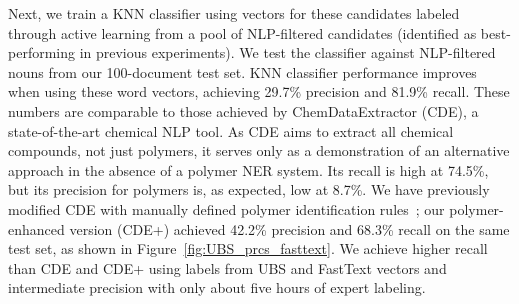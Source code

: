 Next, we train a KNN classifier using vectors for these candidates labeled through active learning from a pool of NLP-filtered candidates (identified as best-performing in previous experiments).
We test the classifier against NLP-filtered nouns from our 100-document test set.
KNN classifier performance improves when using these word vectors, 
achieving 29.7\% precision and 81.9\% recall.
These numbers are comparable to those achieved by ChemDataExtractor (CDE), a state-of-the-art chemical NLP tool.
As CDE aims to extract all
chemical compounds, not just polymers, it serves only as a demonstration of an
alternative approach in the absence of a polymer NER system. %
Its recall is high
at 74.5\%, but its precision for polymers is, as expected, low at 8.7\%. 
We have previously modified CDE with
manually defined polymer identification rules~\cite{tchoua2017towards};
our polymer-enhanced version (CDE+) achieved 42.2\% precision and 68.3\% recall on the same test set,
as shown in Figure~\ref{fig:UBS_prcs_fasttext}.
We achieve higher recall than CDE and CDE+ using labels from UBS and FastText vectors and intermediate precision with only about five hours of expert labeling.

